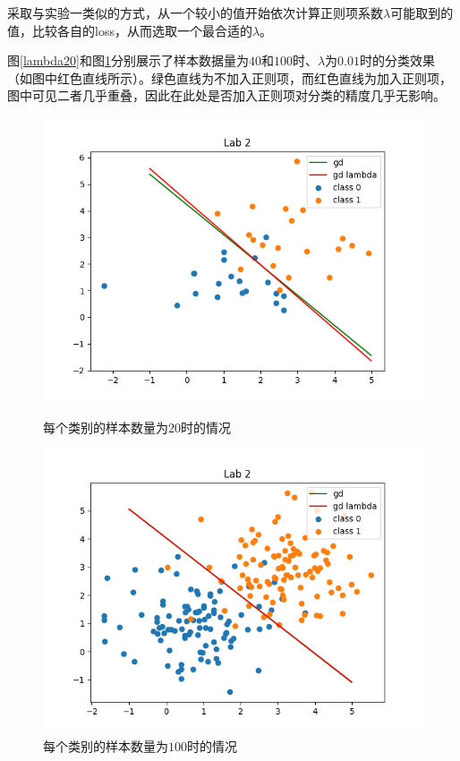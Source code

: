 采取与实验一类似的方式，从一个较小的值开始依次计算正则项系数$\lambda$可能取到的值，比较各自的loss，从而选取一个最合适的$\lambda$。

图\ref{lambda20}和图\ref{lambda100}分别展示了样本数据量为$40$和$100$时、$\lambda$为$0.01$时的分类效果（如图中红色直线所示）。绿色直线为不加入正则项，而红色直线为加入正则项，图中可见二者几乎重叠，因此在此处是否加入正则项对分类的精度几乎无影响。

\begin{figure}[htbp]
    \begin{minipage}[t]{0.5\linewidth}
        \centering
        \includegraphics[width=\textwidth]{figures/Figure_4.png}
        \caption{每个类别的样本数量为$20$时的情况}
        \label{lambda20}
    \end{minipage}
    \begin{minipage}[t]{0.5\linewidth}
        \centering
        \includegraphics[width=\textwidth]{figures/Figure_5.png}
        \caption{每个类别的样本数量为$100$时的情况}
        \label{lambda100}
    \end{minipage}
\end{figure}

